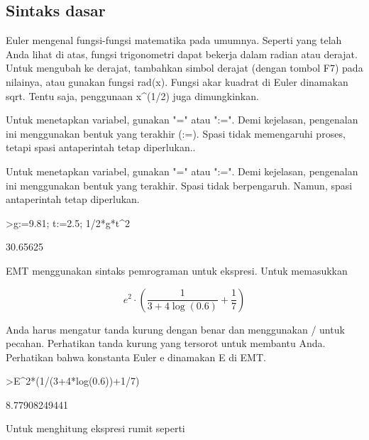 \documentclass{article}
\newenvironment{eulernotebook}{\par}{\par}
\newcommand{\eulersubheading}[1]{\subsection{#1}}
\newenvironment{eulercomment}{\par\medskip}{\par\medskip}
\newenvironment{eulerformula}{}{}
\begin{document}
\begin{eulernotebook}
\begin{eulercomment}
\end{eulercomment}
\eulersubheading{Sintaks dasar}
\begin{eulercomment}
Euler mengenal fungsi-fungsi matematika pada umumnya. Seperti yang
telah Anda lihat di atas, fungsi trigonometri dapat bekerja dalam
radian atau derajat. Untuk mengubah ke derajat, tambahkan simbol
derajat (dengan tombol F7) pada nilainya, atau gunakan fungsi rad(x).
Fungsi akar kuadrat di Euler dinamakan sqrt. Tentu saja, penggunaan
x\textasciicircum{}(1/2) juga dimungkinkan.

Untuk menetapkan variabel, gunakan "=" atau ":=". Demi kejelasan,
pengenalan ini menggunakan bentuk yang terakhir (:=). Spasi tidak
memengaruhi proses, tetapi spasi antaperintah tetap diperlukan..

Untuk menetapkan variabel, gunakan "=" atau ":=". Demi kejelasan,
pengenalan ini menggunakan bentuk yang terakhir. Spasi tidak
berpengaruh. Namun, spasi antaperintah tetap diperlukan.
\end{eulercomment}
\begin{eulerprompt}
>g:=9.81; t:=2.5; 1/2*g*t^2
\end{eulerprompt}
\begin{euleroutput}
  30.65625
\end{euleroutput}
\begin{eulercomment}
EMT menggunakan sintaks pemrograman untuk ekspresi. Untuk memasukkan

\end{eulercomment}
\begin{eulerformula}
\[
e^2 \cdot \left( \frac{1}{3+4 \log(0.6)}+\frac{1}{7} \right)
\]
\end{eulerformula}
\begin{eulercomment}
Anda harus mengatur tanda kurung dengan benar dan menggunakan / untuk
pecahan. Perhatikan tanda kurung yang tersorot untuk membantu Anda.
Perhatikan bahwa konstanta Euler \textdollar{}e\textdollar{} dinamakan E di EMT.
\end{eulercomment}
\begin{eulerprompt}
>E^2*(1/(3+4*log(0.6))+1/7)
\end{eulerprompt}
\begin{euleroutput}
  8.77908249441
\end{euleroutput}
\begin{eulercomment}
Untuk menghitung ekspresi rumit seperti


\end{eulercomment}
\end{eulernotebook}
\end{document}
